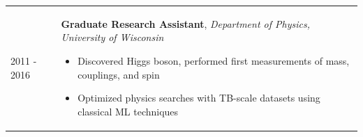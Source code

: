 \documentclass{letter}
\begin{document}
\begin{tabular}{p{}p{}}
  2011 - 2016
  &
  \textbf{Graduate Research Assistant}, \textit{Department of Physics, University of Wisconsin} \newline
  \vspace{-15pt}  %
  \begin{itemize}
    \itemsep0em
    \renewcommand{\labelitemi}{\tiny$\blacksquare$}
    \item Discovered Higgs boson, performed first measurements of mass, couplings, and spin 
    \item Optimized physics searches with TB-scale datasets using classical ML techniques
  \end{itemize}
  \\



\end{tabular}
\end{document}
